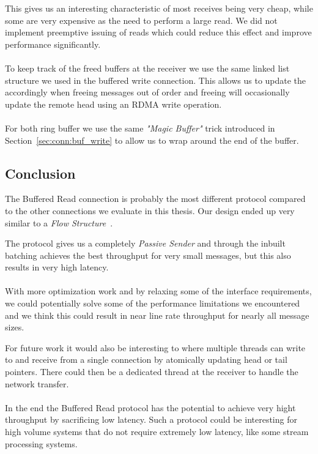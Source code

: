 This gives us an interesting characteristic of most receives being very cheap, while some are very expensive as the need to 
perform a large read. We did not implement preemptive issuing of reads which could reduce this effect and improve performance
significantly.

\paragraph{} To keep track of the freed buffers at the receiver we use the same linked list structure we used in the buffered
write connection. This allows us to update the  accordingly when freeing messages out of order and freeing will
occasionally update the remote head using an RDMA write operation.

\paragraph{} For both ring buffer we use the same \emph{"Magic Buffer"} trick introduced in Section~\ref{sec:conn:buf_write} to 
allow us to wrap around the end of the buffer.

\subsection{Conclusion}
The Buffered Read connection is probably the most different protocol compared to the other connections we evaluate in this
thesis. Our design ended up very similar to a \emph{Flow Structure}~\cite{sharma2020design}.

The protocol gives us a completely \emph{Passive Sender} and through the inbuilt batching achieves the best throughput for 
very small messages, but this also results in very high latency.

\paragraph{} With more optimization work and by relaxing some of the interface requirements, we could potentially solve 
some of the performance limitations we encountered and we think this could result in near line rate throughput for nearly 
all message sizes.

For future work it would also be interesting to where multiple threads can write to and receive from a single connection 
by atomically updating head or tail pointers. There could then be a dedicated thread at the receiver to handle the network
transfer.

\paragraph{} In the end the Buffered Read protocol has the potential to achieve very hight throughput by sacrificing low 
latency. Such a protocol could be interesting for high volume systems that do not require extremely low latency, like some
stream processing systems.

